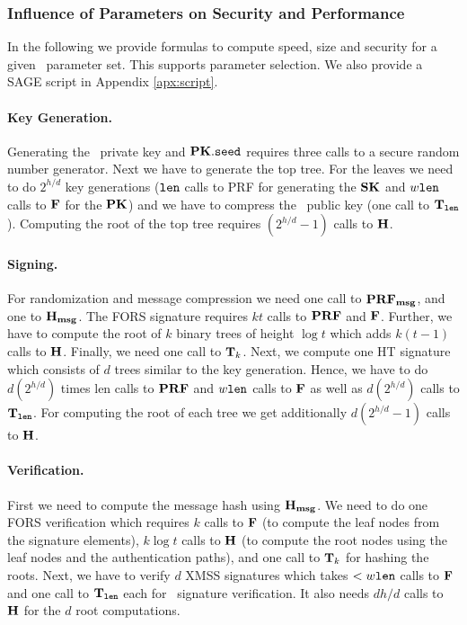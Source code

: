 \subsubsection{Influence of Parameters on Security and Performance} \label{sec:securityandperformance}

In the following we provide formulas to compute speed, size and security for a given \SPHINCSA\ parameter set. This supports parameter selection. We also provide a SAGE script in Appendix \ref{apx:script}.
 

\paragraph{Key Generation.} 
Generating the \SPHINCSA\ private key and $\mathbf{PK}.\mathtt{seed}$ requires three calls to a secure random number generator. Next we have to generate the top tree. For the leaves we need to do $2^{h/d}$ \WOTSCS key generations ($\mathtt{len}$ calls to PRF for generating the $\mathbf{SK}$ and $w \mathtt{len}$ calls to $\mathbf{F}$ for the $\mathbf{PK}$) and we have to compress the \WOTSCS\ public key (one call to $\mathbf{T}_{\mathtt{len}}$). Computing the root of the top tree requires $(2^{h/d}-1)$ calls to $\mathbf{H}$.

\paragraph{Signing.}
For randomization and message compression we need one call to $\mathbf{PRF_{msg}}$, and one to $\mathbf{H_{msg}}$. The FORS signature requires $kt$ calls to $\mathbf{PRF}$ and $\mathbf{F}$. Further, we have to compute the root of $k$ binary trees of height $\log t$ which adds $k(t-1)$ calls to $\mathbf{H}$. Finally, we need one call to $\mathbf{T}_{k}$. Next, we compute one HT signature which consists of $d$ trees similar to the key generation. Hence, we have to do $d(2^{h/d})$ times len calls to $\mathbf{PRF}$ and $w \mathtt{len}$ calls to $\mathbf{F}$ as well as $d(2^{h/d})$ calls to $\mathbf{T}_{\mathtt{len}}$. For computing the root of each tree we get additionally $d(2^{h/d}-1)$ calls to $\mathbf{H}$.

\paragraph{Verification.}
First we need to compute the message hash using $\mathbf{H_{msg}}$. We need to do one FORS verification which requires $k$ calls to $\mathbf{F}$ (to compute the leaf nodes from the signature elements), $k\log t$ calls to $\mathbf{H}$ (to compute the root nodes using the leaf nodes and the authentication paths), and one call to $\mathbf{T}_{k}$ for hashing the roots. Next, we have to verify $d$ XMSS signatures which takes $< w \mathtt{len}$ calls to $\mathbf{F}$ and one call to $\mathbf{T}_{\mathtt{len}}$ each for \WOTSCS\ signature verification\footnotemark. It also needs $dh/d$ calls to $\mathbf{H}$ for the $d$ root computations.

